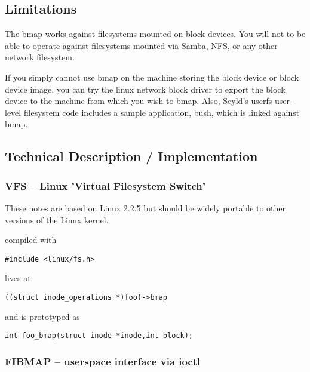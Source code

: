 \documentclass[letterpaper]{article}
\begin{document}
\subsection{Limitations}

The bmap works against filesystems mounted on block devices.
You will not to be able to operate against filesystems mounted
via Samba, NFS, or any other network filesystem.

If you simply cannot use bmap on the machine storing the block
device or block device image, you can try the linux network block driver
to export the block device to the machine from which you wish to bmap. Also,
Scyld's userfs user-level filesystem code includes a sample application,
bush, which is linked against bmap.




\subsection{Technical Description / Implementation}






\subsubsection{VFS -- Linux 'Virtual Filesystem Switch'}

These notes are based on Linux 2.2.5 but should be widely portable
to other versions of the Linux kernel.

compiled with
\begin{verbatim}
#include <linux/fs.h>
\end{verbatim}


lives at 
\begin{verbatim}
((struct inode_operations *)foo)->bmap
\end{verbatim}


and is prototyped as 
\begin{verbatim}
int foo_bmap(struct inode *inode,int block);
\end{verbatim}





\subsubsection{FIBMAP -- userspace interface via ioctl}
\end{document}
